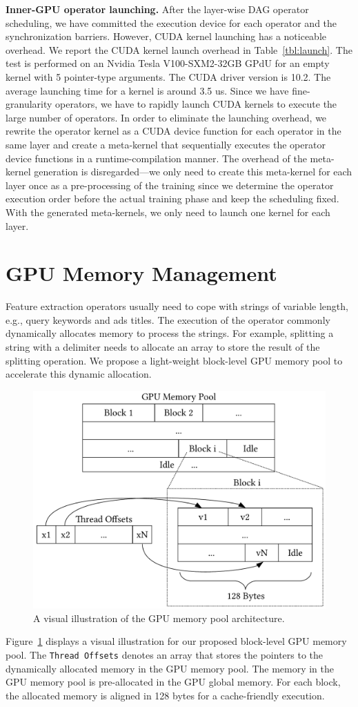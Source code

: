 \documentclass[sigconf]{acmart}
\begin{document}
\textbf{Inner-GPU operator launching.} 
After the layer-wise DAG operator scheduling, we have committed the execution device for each operator and the synchronization barriers. However, CUDA kernel launching has a noticeable overhead. 
We report the CUDA kernel launch overhead in Table~\ref{tbl:launch}. 
The test is performed on an Nvidia Tesla V100-SXM2-32GB GPdU for an empty kernel with 5 pointer-type arguments. The CUDA driver version is 10.2. The average launching time for a kernel is around 3.5 us. Since we have fine-granularity operators, we have to rapidly launch CUDA kernels to execute the large number of operators. In order to eliminate the launching overhead, we rewrite the operator kernel as a CUDA device function for each operator in the same layer and create a meta-kernel that sequentially executes the operator device functions in a runtime-compilation manner. The overhead of the meta-kernel generation is disregarded---we only need to create this meta-kernel for each layer once as a pre-processing of the training since we determine the operator execution order before the actual training phase and keep the scheduling fixed. 
With the generated meta-kernels, we only need to launch one kernel for each layer.


\section{GPU Memory Management}

Feature extraction operators usually need to cope with strings of variable length, e.g., query keywords and ads titles. The execution of the operator commonly dynamically allocates memory to process the strings. For example, splitting a string with a delimiter needs to allocate an array to store the result of the splitting operation. We propose a light-weight block-level GPU memory pool to accelerate this dynamic allocation. 
\begin{figure}[htbp]
\centering
\includegraphics[width=.5\textwidth]{figs/gpu_memory}
\caption{A visual illustration of the GPU memory pool architecture.}
\label{fig:memory}
\end{figure}
Figure~\ref{fig:memory} displays a visual illustration for our proposed block-level GPU memory pool. 
The \texttt{Thread Offsets} denotes an array that stores the pointers to the dynamically allocated memory in the GPU memory pool. The memory in the GPU memory pool is pre-allocated in the GPU global memory. For each block, the allocated memory is aligned in 128 bytes for a cache-friendly execution.
\end{document}
